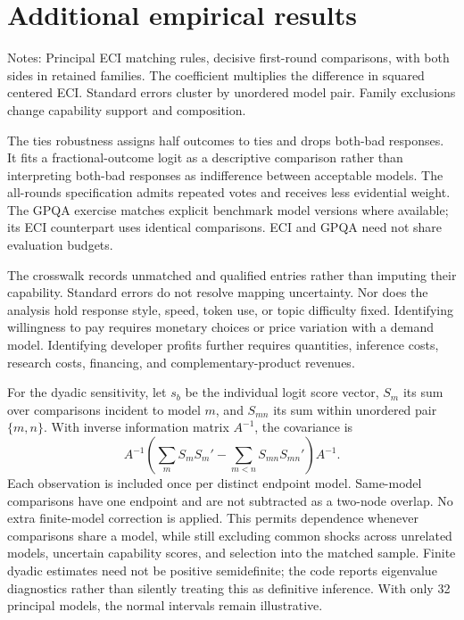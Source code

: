 \section{Additional empirical results}\label{app:empirical}
\begin{table}[htbp]\centering\small
\caption{Leaving out one model family at a time}\label{tab:family}

\begin{minipage}{\textwidth}\footnotesize\vspace{0.5em}
Notes: Principal ECI matching rules, decisive first-round comparisons, with both sides in retained families. The coefficient multiplies the difference in squared centered ECI. Standard errors cluster by unordered model pair. Family exclusions change capability support and composition.
\end{minipage}
\end{table}

The ties robustness assigns half outcomes to ties and drops both-bad responses. It fits a fractional-outcome logit as a descriptive comparison rather than interpreting both-bad responses as indifference between acceptable models. The all-rounds specification admits repeated votes and receives less evidential weight. The GPQA exercise matches explicit benchmark model versions where available; its ECI counterpart uses identical comparisons. ECI and GPQA need not share evaluation budgets.

The crosswalk records unmatched and qualified entries rather than imputing their capability. Standard errors do not resolve mapping uncertainty. Nor does the analysis hold response style, speed, token use, or topic difficulty fixed. Identifying willingness to pay requires monetary choices or price variation with a demand model. Identifying developer profits further requires quantities, inference costs, research costs, financing, and complementary-product revenues.

\begin{table}[htbp]\centering\small
\caption{Dependence assumptions and descriptive uncertainty}\label{tab:inference}

\end{table}
For the dyadic sensitivity, let $s_b$ be the individual logit score vector, $S_m$ its sum over comparisons incident to model $m$, and $S_{mn}$ its sum within unordered pair $\{m,n\}$. With inverse information matrix $A^{-1}$, the covariance is
\begin{equation}
 A^{-1}\left(\sum_m S_mS_m'-\sum_{m<n}S_{mn}S_{mn}'\right)A^{-1}.
\end{equation}
Each observation is included once per distinct endpoint model. Same-model comparisons have one endpoint and are not subtracted as a two-node overlap. No extra finite-model correction is applied. This permits dependence whenever comparisons share a model, while still excluding common shocks across unrelated models, uncertain capability scores, and selection into the matched sample. Finite dyadic estimates need not be positive semidefinite; the code reports eigenvalue diagnostics rather than silently treating this as definitive inference. With only 32 principal models, the normal intervals remain illustrative.


